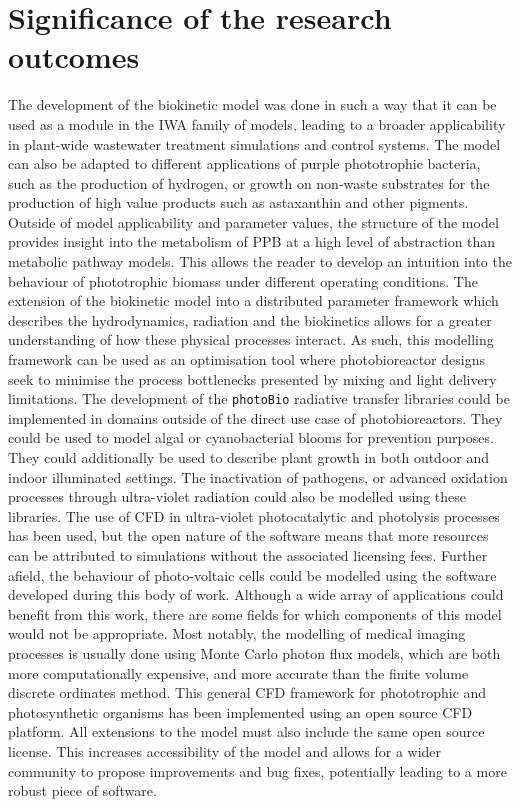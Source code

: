 \section{Significance of the research outcomes}
The development of the biokinetic model was done in such a way that it can be used as a module in the IWA family of models, leading to a broader applicability in plant-wide wastewater treatment simulations and control systems. The model can also be adapted to different applications of purple phototrophic bacteria, such as the production of hydrogen, or growth on non-waste substrates for the production of high value products such as astaxanthin and other pigments. Outside of model applicability and parameter values, the structure of the model provides insight into the metabolism of PPB at a high level of abstraction than metabolic pathway models. This allows the reader to develop an intuition into the behaviour of phototrophic biomass under different operating conditions. 
\skippingparagraph
The extension of the biokinetic model into a distributed parameter framework which describes the hydrodynamics, radiation and the biokinetics allows for a greater understanding of how these physical processes interact. As such, this modelling framework can be used as an optimisation tool where photobioreactor designs seek to minimise the process bottlenecks presented by mixing and light delivery limitations. The development of the \texttt{photoBio} radiative transfer libraries could be implemented in domains outside of the direct use case of photobioreactors. They could be used to model algal or cyanobacterial blooms for prevention purposes. They could additionally be used to describe plant growth in both outdoor and indoor illuminated settings. The inactivation of pathogens, or advanced oxidation processes through ultra-violet radiation could also be modelled using these libraries. The use of CFD in ultra-violet photocatalytic and photolysis processes has been used, but the open nature of the software means that more resources can be attributed to simulations without the associated licensing fees. Further afield, the behaviour of photo-voltaic cells could be modelled using the software developed during this body of work. Although a wide array of applications could benefit from this work, there are some fields for which components of this model would not be appropriate. Most notably, the modelling of medical imaging processes is usually done using Monte Carlo photon flux models, which are both more computationally expensive, and more accurate than the finite volume discrete ordinates method.
\skippingparagraph
This general CFD framework for phototrophic and photosynthetic organisms has been implemented using an open source CFD platform. All extensions to the model must also include the same open source license. This increases accessibility of the model and allows for a wider community to propose improvements and bug fixes, potentially leading to a more robust piece of software. 

